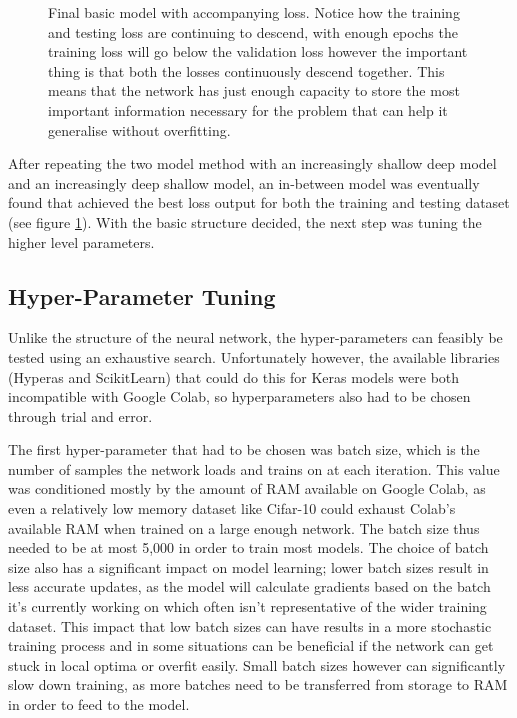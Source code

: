 \documentclass{l4proj}
\begin{document}
\begin{figure}[h]
\begin{subfigure}[b]{0.41\textwidth}
        \caption{}
    \end{subfigure} 
    \caption{Final basic model with accompanying loss. Notice how the training and testing loss are continuing to descend, with enough epochs the training loss will go below the validation loss however the important thing is that both the losses continuously descend together. This means that the network has just enough capacity to store the most important information necessary for the problem that can help it generalise without overfitting.}
    \label{fig:final_basic_model}
\end{figure}

After repeating the two model method with an increasingly shallow deep model and an increasingly deep shallow model, an in-between model was eventually found that achieved the best loss output for both the training and testing dataset (see figure \ref{fig:final_basic_model}). With the basic structure decided, the next step was tuning the higher level parameters. 

\subsection{Hyper-Parameter Tuning}
Unlike the structure of the neural network, the hyper-parameters can feasibly be tested using an exhaustive search. Unfortunately however, the available libraries (Hyperas and ScikitLearn) that could do this for Keras models were both incompatible with Google Colab, so hyperparameters also had to be chosen through trial and error.

The first hyper-parameter that had to be chosen was batch size, which is the number of samples the network loads and trains on at each iteration. This value was conditioned mostly by the amount of RAM available on Google Colab, as even a relatively low memory dataset like Cifar-10 could exhaust Colab's available RAM when trained on a large enough network. The batch size thus needed to be at most 5,000 in order to train most models. The choice of batch size also has a significant impact on model learning; lower batch sizes result in less accurate updates, as the model will calculate gradients based on the batch it's currently working on which often isn't representative of the wider training dataset. This impact that low batch sizes can have results in a more stochastic training process and in some situations can be beneficial if the network can get stuck in local optima or overfit easily. Small batch sizes however can significantly slow down training, as more batches need to be transferred from storage to RAM in order to feed to the model. 
\end{document}
